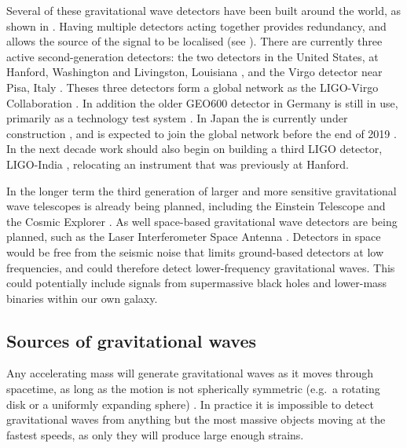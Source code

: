 \begin{colsection}
\begin{colsection}
\newpage

Several of these gravitational wave detectors have been built around the world, as shown in . Having multiple detectors acting together provides redundancy, and allows the source of the signal to be localised (see ). There are currently three active second-generation detectors: the two  detectors in the United States, at Hanford, Washington and Livingston, Louisiana \citep{LIGO}, and the  Virgo detector near Pisa, Italy \citep{Virgo}. Theses three detectors form a global network as the LIGO-Virgo Collaboration  \citep[LVC,][]{LIGO-Virgo}. In addition the older GEO600 detector in Germany is still in use, primarily as a technology test system \citep{GEO600}. In Japan the  is currently under construction \citep{KAGRA}, and is expected to join the global network before the end of 2019 \citep{LIGO-Virgo-KAGRA}. In the next decade work should also begin on building a third LIGO detector, LIGO-India \citep{LIGO_India}, relocating an instrument that was previously at Hanford.

In the longer term the third generation of larger and more sensitive gravitational wave telescopes is already being planned, including the Einstein Telescope \citep{EinsteinTelescope} and the Cosmic Explorer \citep{CosmicExplorer}. As well space-based gravitational wave detectors are being planned, such as the Laser Interferometer Space Antenna  \citep[LISA,][]{LISA}. Detectors in space would be free from the seismic noise that limits ground-based detectors at low frequencies, and could therefore detect lower-frequency gravitational waves. This could potentially include signals from supermassive black holes and lower-mass binaries within our own galaxy.

\end{colsection}

\newpage
\subsection{Sources of gravitational waves}
\label{sec:gw_sources}
\begin{colsection}

Any accelerating mass will generate gravitational waves as it moves through spacetime, as long as the motion is not spherically symmetric (e.g.\ a rotating disk or a uniformly expanding sphere) \citep{BIGcardiff,BIGparis}. In practice it is impossible to detect gravitational waves from anything but the most massive objects moving at the fastest speeds, as only they will produce large enough strains.


\end{colsection}
\end{colsection}
